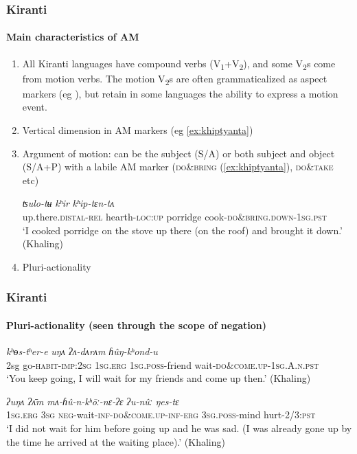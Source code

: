 \documentclass[xcolor=table]{beamer}
\newcommand{\rouge}[1]{{\color{red}#1}}
\newcommand{\ipa}[1]{{\phon\textit{#1}}}
\begin{document}
  
\begin{frame} 
\frametitle{Kiranti}
 \framesubtitle{Main characteristics of AM}
\begin{enumerate}
\item All Kiranti languages have compound verbs (V\textsubscript{1}+V\textsubscript{2}), and some V\textsubscript{2}s come from motion verbs. The motion V\textsubscript{2}s are often grammaticalized as aspect markers (eg \citealt{bickel96aspect}), but retain in some languages the ability to express a motion event.
\item Vertical dimension in AM markers (eg \ref{ex:khiptyanta})
\item Argument of motion: can be the subject (S/A) or both subject and object (S/A+P) with a labile AM marker (\rouge{\textsc{do\&bring}} (\ref{ex:khiptyanta}), \rouge{\textsc{do\&take}} etc)
\begin{exe}
\ex \label{ex:khiptyanta}
 \gll \ipa{tukkâ-m}	\ipa{ʦulo-tʉ}	\ipa{kʰir}	\ipa{kʰip-\rouge{tɛn}-tʌ} \\
  up.there.\textsc{distal}-\textsc{rel} hearth-\textsc{loc}:\textsc{up} porridge cook-\rouge{\textsc{do\&bring.down}}-\textsc{1sg}.\textsc{pst} \\
  \glt `I cooked porridge on the stove up there (on the roof) and \rouge{brought it down}.' (Khaling)
 \end{exe}
 \item Pluri-actionality
\end{enumerate}
\end{frame}  

\begin{frame} 
\frametitle{Kiranti}
 \framesubtitle{Pluri-actionality (seen through the scope of negation)}

\begin{exe}  
\ex \label{ex:hungkhondu}
 \gll  \ipa{ʔīn} \ipa{kʰɵs-tʰer-e} \ipa{uŋʌ} \ipa{ʔʌ-dʌrʌm} \ipa{ɦûŋ-\rouge{kʰond}-u} \\
 2sg go-\textsc{habit}-\textsc{imp}:\textsc{2sg} \textsc{1sg}.\textsc{erg} \textsc{1sg}.\textsc{poss}-friend wait-\rouge{\textsc{do\&come.up}}-\textsc{1sg.A.n.pst} \\
\glt `You keep going, I will wait for my friends and \rouge{come up} then.' (Khaling)
\end{exe}

\begin{exe}
\ex \label{ex:mahunkhonya}
 \gll
\ipa{ʔuŋʌ} \ipa{ʔʌ̄m} \ipa{mʌ-ɦû-n-\rouge{kʰōː}-nɛ-ʔɛ} \ipa{ʔu-nûː} \ipa{ŋes-tɛ} \\
\textsc{1sg}.\textsc{erg} \textsc{3sg} \textsc{neg}-wait-\textsc{inf}-\rouge{\textsc{do\&come.up}}-\textsc{inf}-\textsc{erg} \textsc{3sg}.\textsc{poss}-mind hurt-2/3:\textsc{pst} \\
\glt `I did not wait for him \rouge{before going up} and he was sad. (I was already gone up by the time he arrived at the waiting place).' (Khaling)
\end{exe}
\end{frame}  
\end{document}

